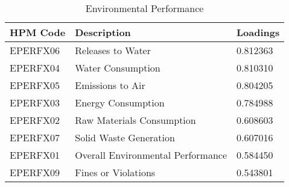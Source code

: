 \begin{table}[htbp]
\centering
\caption{Environmental Performance}
\label{tab:your_label}
\begin{tabular}{lll}
\toprule
HPM Code & Description & Loadings \\
\midrule
EPERFX06 & Releases to Water & 0.812363 \\
EPERFX04 & Water Consumption & 0.810310 \\
EPERFX05 & Emissions to Air & 0.804205 \\
EPERFX03 & Energy Consumption & 0.784988 \\
EPERFX02 & Raw Materials Consumption & 0.608603 \\
EPERFX07 & Solid Waste Generation & 0.607016 \\
EPERFX01 & Overall Environmental Performance & 0.584450 \\
EPERFX09 & Fines or Violations & 0.543801 \\
\bottomrule
\end{tabular}
\end{table}